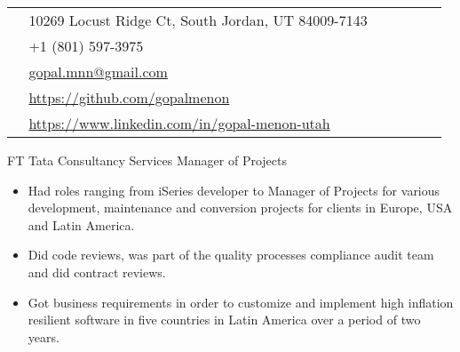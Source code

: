 \documentclass[10pt]{article} %
\begin{document}
\begin{paracol}{2}





\parbox[top][0.12\textheight][c]{\linewidth}{ %
	\vspace{-0.04\textheight} %
	\colorbox{shade}{ %
		\begin{supertabular}{p{0.03\linewidth}|p{0.94\linewidth}} %
			\raisebox{-1pt}{\faHome} & 10269 Locust Ridge Ct, South Jordan, UT 84009-7143 \\ %
			\raisebox{-1pt}{\faPhone} & +1 (801) 597-3975 \\ %
			\raisebox{0pt}{\small\faEnvelope} & \href{mailto:gopal.mnn@gmail.com}{gopal.mnn@gmail.com} \\ %
			\raisebox{-1pt}{\small\faDesktop} & \href{https://github.com/gopalmenon}{https://github.com/gopalmenon} \\ %
			\raisebox{-1pt}{\small\faDesktop} & \href{https://www.linkedin.com/in/gopal-menon-utah}{https://www.linkedin.com/in/gopal-menon-utah} \\ %
		\end{supertabular}
	}
}


{FT} %
{Tata Consultancy Services} %
{Manager of Projects} %
{}  %
\begin{itemize}
	\setlength\itemsep{0em}
	\item Had roles ranging from iSeries developer to Manager of Projects for various development, maintenance and conversion projects for clients in Europe, USA and Latin America. 
	\item Did code reviews, was part of the quality processes compliance audit team and did contract reviews. 
	\item Got business requirements in order to customize and implement high inflation resilient software in five countries in Latin America over a period of two years. 
\end{itemize}


\end{paracol}
\end{document}
